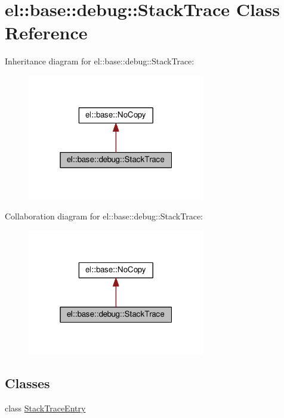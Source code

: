 \hypertarget{classel_1_1base_1_1debug_1_1_stack_trace}{}\section{el\+:\+:base\+:\+:debug\+:\+:Stack\+Trace Class Reference}
\label{classel_1_1base_1_1debug_1_1_stack_trace}


Inheritance diagram for el\+:\+:base\+:\+:debug\+:\+:Stack\+Trace\+:
\nopagebreak
\begin{figure}[H]
\begin{center}
\leavevmode
\includegraphics[width=220pt]{classel_1_1base_1_1debug_1_1_stack_trace__inherit__graph}
\end{center}
\end{figure}


Collaboration diagram for el\+:\+:base\+:\+:debug\+:\+:Stack\+Trace\+:
\nopagebreak
\begin{figure}[H]
\begin{center}
\leavevmode
\includegraphics[width=220pt]{classel_1_1base_1_1debug_1_1_stack_trace__coll__graph}
\end{center}
\end{figure}
\subsection*{Classes}
\begin{DoxyCompactItemize}
\item 
class \hyperlink{classel_1_1base_1_1debug_1_1_stack_trace_1_1_stack_trace_entry}{Stack\+Trace\+Entry}
\end{DoxyCompactItemize}
